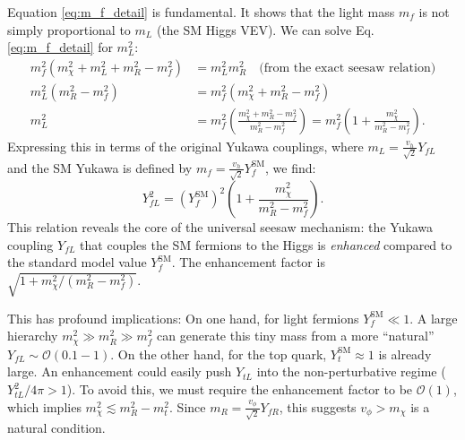 Equation \eqref{eq:m_f_detail} is fundamental. It shows that the light mass $m_f$ is not simply proportional to $m_L$ (the SM Higgs VEV). We can solve Eq. \eqref{eq:m_f_detail} for $m_L^2$:
\begin{align*}
m_f^2 (m_{\chi}^2 + m_L^2 + m_R^2 - m_f^2) &= m_L^2 m_R^2 \quad \text{(from the exact seesaw relation)} \\
m_L^2 (m_R^2 - m_f^2) &= m_f^2 (m_{\chi}^2 + m_R^2 - m_f^2) \\
m_L^2 &= m_f^2 \left( \frac{m_{\chi}^2 + m_R^2 - m_f^2}{m_R^2 - m_f^2} \right) = m_f^2 \left( 1 + \frac{m_{\chi}^2}{m_R^2 - m_f^2} \right). \label{eq:m_L_solution_detail}
\end{align*}
Expressing this in terms of the original Yukawa couplings, where $m_L = \frac{v_h}{\sqrt{2}} Y_{fL}$ and the SM Yukawa is defined by $m_f = \frac{v_h}{\sqrt{2}} Y_f^{\text{SM}}$, we find:
\begin{equation}
Y_{fL}^2 = (Y_f^{\text{SM}})^2 \left( 1 + \frac{m_{\chi}^2}{m_R^2 - m_f^2} \right). \label{eq:Y_L_enhanced_detail}
\end{equation}
This relation reveals the core of the universal seesaw mechanism: the Yukawa coupling $Y_{fL}$ that couples the SM fermions to the Higgs is \textit{enhanced} compared to the standard model value $Y_f^{\text{SM}}$. The enhancement factor is $\sqrt{1 + m_{\chi}^2/(m_R^2 - m_f^2)}$.

This has profound implications: On one hand, for light fermions $Y_f^{\text{SM}} \ll 1$. A large hierarchy $m_{\chi}^2 \gg m_R^2 \gg m_f^2$ can generate this tiny mass from a more ``natural'' $Y_{fL} \sim \mathcal{O}(0.1-1)$. On the other hand, for the top quark, $Y_t^{\text{SM}} \approx 1$ is already large. An enhancement could easily push $Y_{tL}$ into the non-perturbative regime ($Y_{tL}^2 / 4\pi > 1$). To avoid this, we must require the enhancement factor to be $\mathcal{O}(1)$, which implies $m_{\chi}^2 \lesssim m_R^2 - m_t^2$. Since $m_R = \frac{v_\phi}{\sqrt{2}} Y_{fR}$, this suggests $v_\phi > m_{\chi}$ is a natural condition.


